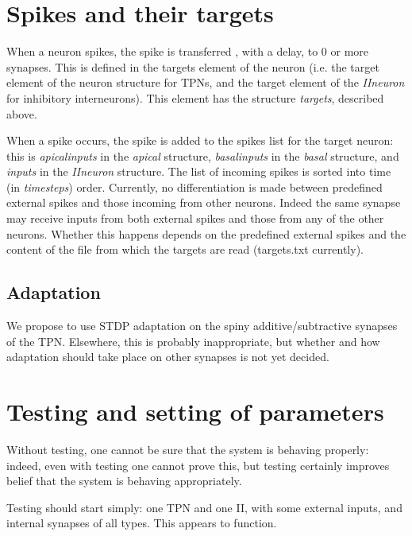 \documentclass[11pt, oneside]{article}   	%
\begin{document}
\section{Spikes and their targets}
When a neuron spikes, the spike is transferred , with a delay, to 0 or more synapses. This is defined in the targets element of the neuron (i.e. the target element of the neuron structure for TPNs, and the target element of the {\it IIneuron} for inhibitory interneurons). This element has the structure {\it targets}, described above. 

When a spike occurs, the spike is added to the spikes list for the target neuron: this is {\it apicalinputs} in the {\it apical} structure, {\it basalinputs} in the {\it basal} structure, and {\it inputs} in the {\it IIneuron} structure. The list of incoming spikes is sorted into time (in {\it timesteps}) order. Currently, no differentiation is made between predefined external spikes and those incoming from other neurons. Indeed the same synapse may receive inputs from both external spikes and those from any of the other neurons. Whether this happens depends on the predefined external spikes and the content of the file from which the targets are read (targets.txt currently).

\subsection{Adaptation}
We propose to use STDP adaptation on the spiny additive/subtractive synapses of the TPN. Elsewhere, this is probably inappropriate, but whether and how adaptation should take place on other synapses is not yet decided.

\section{Testing and setting of parameters}
Without testing, one cannot be sure that the system is behaving properly: indeed, even with testing one cannot prove this, but testing certainly improves  belief that the system is behaving appropriately. 

Testing should start simply:  one TPN and one II, with some external inputs, and  internal synapses of all types. This appears to function.
\end{document}
